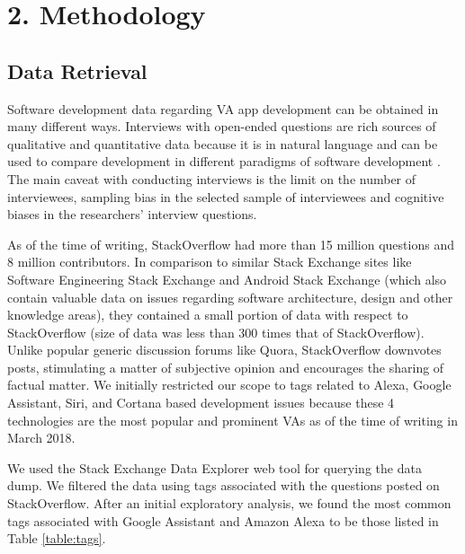 \documentclass{sigchi}
\begin{document}
\section{2. Methodology}
\subsection{Data Retrieval}
Software development data regarding VA app development can be obtained in many different ways. Interviews with open-ended questions are rich sources of qualitative and quantitative data because it is in natural language and can be used to compare development in different paradigms of software development \cite{1murphy2014cowboys}. The main caveat with conducting interviews is the limit on the number of interviewees, sampling bias in the selected sample of interviewees and cognitive biases in the researchers' interview questions. 

As of the time of writing, StackOverflow had more than 15 million questions and 8 million contributors. In comparison to similar Stack Exchange sites like Software Engineering Stack Exchange and Android Stack Exchange (which also contain valuable data on issues regarding software architecture, design and other knowledge areas), they contained a small portion of data with respect to StackOverflow (size of data was less than 300 times that of StackOverflow). Unlike popular generic discussion forums like Quora, StackOverflow downvotes posts, stimulating a matter of subjective opinion and encourages the sharing of factual matter. 
We initially restricted our scope to tags related to Alexa, Google Assistant, Siri, and Cortana based development issues because these 4 technologies are the most popular and prominent VAs as of the time of writing in March 2018. 

We used the Stack Exchange Data Explorer web tool for querying the data dump. We filtered the data using tags associated with the questions posted on StackOverflow. After an initial exploratory analysis, we found the most common tags associated with Google Assistant and Amazon Alexa to be those listed in Table \ref{table:tags}.

\end{document}
